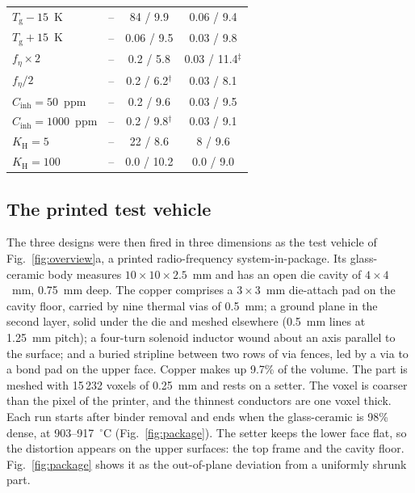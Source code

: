 \begin{table}[!tp]
\begin{tabular}{@{}lccc@{}}
$T_{\mathrm{g}} - 15$~K & -- & 84 / 9.9 & 0.06 / 9.4 \\
$T_{\mathrm{g}} + 15$~K & -- & 0.06 / 9.5 & 0.03 / 9.8 \\
$f_\eta \times 2$ & -- & 0.2 / 5.8 & 0.03 / 11.4$^\ddagger$ \\
$f_\eta / 2$ & -- & 0.2 / 6.2$^\dagger$ & 0.03 / 8.1 \\
$C_{\mathrm{inh}} = 50$~ppm & -- & 0.2 / 9.6 & 0.03 / 9.5 \\
$C_{\mathrm{inh}} = 1000$~ppm & -- & 0.2 / 9.8$^\dagger$ & 0.03 / 9.1 \\
$K_{\mathrm{H}} = 5$ & -- & 22 / 8.6 & 8 / 9.6 \\
$K_{\mathrm{H}} = 100$ & -- & 0.0 / 10.2 & 0.0 / 9.0 \\
\bottomrule
\end{tabular}
\end{table}

\subsection{The printed test vehicle}
\label{sec:res_3d}

The three designs were then fired in three dimensions as the test vehicle of Fig.~\ref{fig:overview}a, a printed radio-frequency system-in-package. Its glass-ceramic body measures $10\times10\times2.5$~mm and has an open die cavity of $4\times4$~mm, 0.75~mm deep. The copper comprises a $3\times3$~mm die-attach pad on the cavity floor, carried by nine thermal vias of 0.5~mm; a ground plane in the second layer, solid under the die and meshed elsewhere (0.5~mm lines at 1.25~mm pitch); a four-turn solenoid inductor wound about an axis parallel to the surface; and a buried stripline between two rows of via fences, led by a via to a bond pad on the upper face. Copper makes up 9.7\% of the volume. The part is meshed with 15\,232 voxels of 0.25~mm and rests on a setter. The voxel is coarser than the pixel of the printer, and the thinnest conductors are one voxel thick. Each run starts after binder removal and ends when the glass-ceramic is 98\% dense, at 903--917~$^\circ$C (Fig.~\ref{fig:package}). The setter keeps the lower face flat, so the distortion appears on the upper surfaces: the top frame and the cavity floor. Fig.~\ref{fig:package} shows it as the out-of-plane deviation from a uniformly shrunk part.

